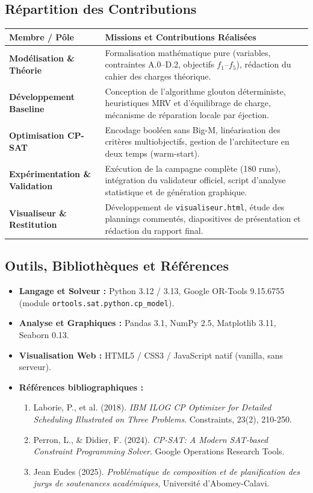 \documentclass[10pt,a4paper]{article}
\begin{document}
\subsection{Répartition des Contributions}
\begin{table}[htbp]
\centering
\small
\begin{tabularx}{\linewidth}{lX}
\toprule
\textbf{Membre / Pôle} & \textbf{Missions et Contributions Réalisées} \\
\midrule
\textbf{Modélisation \& Théorie} & Formalisation mathématique pure (variables, contraintes A.0--D.2, objectifs $f_1$--$f_5$), rédaction du cahier des charges théorique. \\
\textbf{Développement Baseline} & Conception de l'algorithme glouton déterministe, heuristiques MRV et d'équilibrage de charge, mécanisme de réparation locale par éjection. \\
\textbf{Optimisation CP-SAT} & Encodage booléen sans Big-M, linéarisation des critères multiobjectifs, gestion de l'architecture en deux temps (warm-start). \\
\textbf{Expérimentation \& Validation} & Exécution de la campagne complète (180 runs), intégration du validateur officiel, script d'analyse statistique et de génération graphique. \\
\textbf{Visualiseur \& Restitution} & Développement de \texttt{visualiseur.html}, étude des plannings commentés, diapositives de présentation et rédaction du rapport final. \\
\bottomrule
\end{tabularx}
\end{table}

\subsection{Outils, Bibliothèques et Références}
\begin{itemize}
    \item \textbf{Langage et Solveur :} Python 3.12 / 3.13, Google OR-Tools 9.15.6755 (module \texttt{ortools.sat.python.cp\_model}).
    \item \textbf{Analyse et Graphiques :} Pandas 3.1, NumPy 2.5, Matplotlib 3.11, Seaborn 0.13.
    \item \textbf{Visualisation Web :} HTML5 / CSS3 / JavaScript natif (vanilla, sans serveur).
    \item \textbf{Références bibliographiques :}
    \begin{enumerate}
        \item Laborie, P., et al. (2018). \textit{IBM ILOG CP Optimizer for Detailed Scheduling Illustrated on Three Problems}. Constraints, 23(2), 210-250.
        \item Perron, L., \& Didier, F. (2024). \textit{CP-SAT: A Modern SAT-based Constraint Programming Solver}. Google Operations Research Tools.
        \item Jean Eudes (2025). \textit{Problématique de composition et de planification des jurys de soutenances académiques}, Université d'Abomey-Calavi.
    \end{enumerate}
\end{itemize}
\end{document}

